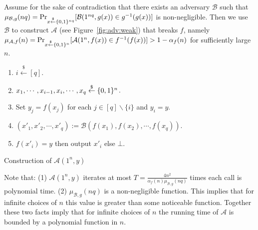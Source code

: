 Assume for the sake of contradiction that there exists an adversary $\mathcal{B}$ such that $\mu_{\mathcal{B},g}(nq) = \Pr_{x \stackrel{\$}{\leftarrow} \{0,1\}^{nq}}[ \mathcal{B}(1^{nq}, g(x)) \in g^{-1}(g(x))]$ is non-negligible.
Then we use $\mathcal{B}$ to construct $\mathcal{A}$ (see Figure~\ref{fig:adv:weak}) that breaks $f$, namely $\mu_{\mathcal{A},f}(n) = \Pr_{x \stackrel{\$}{\leftarrow} \{0,1\}^{n}}[ \mathcal{A}(1^n, f(x)) \in f^{-1}(f(x))] > 1 - \alpha_f(n)$ for sufficiently large $n$.
\begin{marginfigure}[-5cm]
\begin{enumerate}
    \item $i \stackrel{\$}{\leftarrow} [q]$.
    \item $x_1, \cdots, x_{i-1}, x_i, \cdots, x_q \stackrel{\$}{\leftarrow} \{0,1\}^{n}$.
    \item Set $y_j = f(x_j)$ for each $j \in [q]\backslash \{i\}$ and $y_i = y$.
    \item $(x'_1, x'_2, \cdots, x'_q) := \mathcal{B} (f(x_1), f(x_2), \cdots, f(x_q))$.
    \item {$f(x'_i) = y$} then output $x'_i$ else $\bot$.
\end{enumerate}
\caption{Construction of $\mathcal{A}(1^n, y)$}
\label{fig:adv:weak}
\end{marginfigure}

Note that: (1) $\mathcal{A}(1^n, y)$ iterates at most $T = \frac{4n^2}{\alpha_f(n)\mu_{\mathcal{B},g}(nq)}$ times each call is polynomial time. (2) $\mu_{\mathcal{B},g}(nq)$ is a non-negligible function. This implies that for infinite choices of $n$ this value is greater than some noticeable function. Together these two facts imply that for infinite choices of $n$ the running time of $\mathcal{A}$ is bounded by a polynomial function in $n$.

